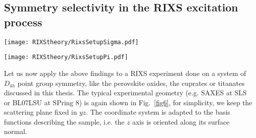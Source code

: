 \documentclass[twocolumn,prb,twocolumn,amsmath,superscriptaddress,nofootinbib,amssymb]{revtex4-1}
\begin{document}
\begin{widetext}
\subsection{Symmetry selectivity in the RIXS excitation process}\label{subsec: Symmetry selectivity in the excitation process}


\begin{figure*}[htbp]
\begin{center}
    \parbox[]{0.49\textwidth}{
        \texttt{[image: RIXStheory/RixsSetupSigma.pdf]}
    }
    \parbox[]{0.49\textwidth}{
        \texttt{[image: RIXStheory/RixsSetupPi.pdf]}
    }
\caption{\label{fig6} Typical RIXS experimental configuration as employed at SAXES at SLS or BL07LSU at SPring 8. The sample is represented by its natural coordinate system. The scattering angle $\tau$ is kept fixed while the momentum transfer direction is varied by changing $\alpha$. \textbf{(left)} $\sigma$-polarized configuration (polarized, $\xi=0$), \textbf{(right)} $\pi$-polarized configuration (depolarized, $\xi=\pi/2$). Note that the polarization of the outgoing light in general can contain polarized and depolarized components. The azimuthal orientation $\phi$ is typically fixed once the sample is mounted.}
\end{center}
\end{figure*}



Let us now apply the above findings to a RIXS experiment done on a system of $D_{4h}$ point group symmetry, like the perovskite oxides, the cuprates or titanates discussed in this thesis. The typical experimental geometry (e.g. SAXES at SLS or BL07LSU at SPring 8) is again shown in Fig.~\ref{fig6}, for simplicity, we keep the scattering plane fixed in $yz$. The coordinate system is adapted to the basis functions describing the sample, i.e. the $z$ axis is oriented along its surface normal.

\begin{figure*}
\begin{center}
\end{center}
\end{figure*}
\end{widetext}
\end{document}
